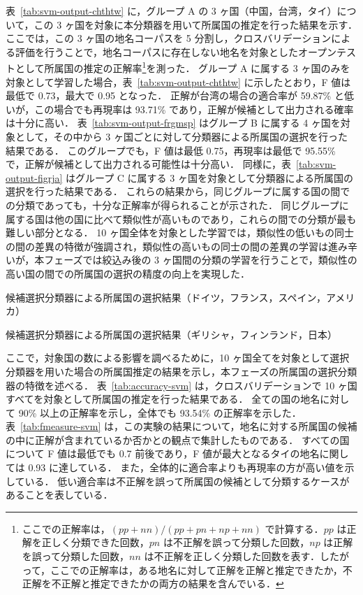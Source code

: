 \documentclass[japanese]{jnlp_1.4}
\begin{document}
表~\ref{tab:svm-output-chthtw} に，グループ A の 3 ヶ国（中国，台湾，タイ）について，この 3 ヶ国を対象に本分類器を用いて所属国の推定を行った結果を示す．
ここでは，この 3 ヶ国の地名コーパスを 5 分割し，クロスバリデーションによる評価を行うことで，地名コーパスに存在しない地名を対象としたオープンテストとして所属国の推定の正解率\footnote{ここでの正解率は，$(pp+nn)/(pp+pn+np+nn)$ で計算する．$pp$ は正解を正しく分類できた回数，$pn$ は不正解を誤って分類した回数，$np$ は正解を誤って分類した回数，$nn$ は不正解を正しく分類した回数を表す．したがって，ここでの正解率は，ある地名に対して正解を正解と推定できたか，不正解を不正解と推定できたかの両方の結果を含んでいる．}を測った．
グループ A に属する 3 ヶ国のみを対象として学習した場合，表~\ref{tab:svm-output-chthtw} に示したとおり，F 値は最低で 0.73，最大で 0.95 となった．
正解が台湾の場合の適合率が 59.87\% と低いが，この場合でも再現率は 93.71\% であり，正解が候補として出力される確率は十分に高い．
表~\ref{tab:svm-output-frgmsp} はグループ B に属する 4 ヶ国を対象として，その中から 3 ヶ国ごとに対して分類器による所属国の選択を行った結果である．
このグループでも，F 値は最低 0.75，再現率は最低で 95.55\% で，正解が候補として出力される可能性は十分高い．
同様に，表~\ref{tab:svm-output-figrja} はグループ C に属する 3 ヶ国を対象として分類器による所属国の選択を行った結果である．
これらの結果から，同じグループに属する国の間での分類であっても，十分な正解率が得られることが示された．
同じグループに属する国は他の国に比べて類似性が高いものであり，これらの間での分類が最も難しい部分となる．
10 ヶ国全体を対象とした学習では，類似性の低いもの同士の間の差異の特徴が強調され，類似性の高いもの同士の間の差異の学習は進み辛いが，本フェーズでは絞込み後の 3 ヶ国間の分類の学習を行うことで，類似性の高い国の間での所属国の選択の精度の向上を実現した．

\begin{table}[b]
 \caption{候補選択分類器による所属国の選択結果（ドイツ，フランス，スペイン，アメリカ）}
 \label{tab:svm-output-frgmsp}

\end{table}
\begin{table}[b]
 \caption{候補選択分類器による所属国の選択結果（ギリシャ，フィンランド，日本）}
 \label{tab:svm-output-figrja}

\end{table}


ここで，対象国の数による影響を調べるために，10 ヶ国全てを対象として選択分類器を用いた場合の所属国推定の結果を示し，本フェーズの所属国の選択分類器の特徴を述べる．
表~\ref{tab:accuracy-svm} は，クロスバリデーションで 10 ヶ国すべてを対象として所属国の推定を行った結果である．
全ての国の地名に対して 90\% 以上の正解率を示し，全体でも 93.54\% の正解率を示した．
表~\ref{tab:fmeasure-svm} は，この実験の結果について，地名に対する所属国の候補の中に正解が含まれているか否かとの観点で集計したものである．
すべての国について F 値は最低でも 0.7 前後であり，F 値が最大となるタイの地名に関しては 0.93 に達している．
また，全体的に適合率よりも再現率の方が高い値を示している．
低い適合率は不正解を誤って所属国の候補として分類するケースがあることを表している．
\end{document}
